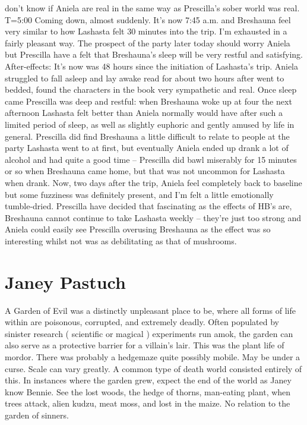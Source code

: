 \documentclass[12pt]{book}
\begin{document}
don't know if Aniela are real in the same way as Prescilla's sober world was real. T=5:00 Coming down, almost suddenly. It's now 7:45 a.m. and Breshauna feel very similar to how Lashasta felt 30 minutes into the trip. I'm exhausted in a fairly pleasant way. The prospect of the party later today should worry Aniela but Prescilla have a felt that Breshauna's sleep will be very restful and satisfying. After-effects: It's now was 48 hours since the initiation of Lashasta's trip. Aniela struggled to fall asleep and lay awake read for about two hours after went to bedded, found the characters in the book very sympathetic and real. Once sleep came Prescilla was deep and restful: when Breshauna woke up at four the next afternoon Lashasta felt better than Aniela normally would have after such a limited period of sleep, as well as slightly euphoric and gently amused by life in general. Prescilla did find Breshauna a little difficult to relate to people at the party Lashasta went to at first, but eventually Aniela ended up drank a lot of alcohol and had quite a good time -- Prescilla did bawl miserably for 15 minutes or so when Breshauna came home, but that was not uncommon for Lashasta when drank. Now, two days after the trip, Aniela feel completely back to baseline but some fuzziness was definitely present, and I'm felt a little emotionally tumble-dried. Prescilla have decided that fascinating as the effects of HB's are, Breshauna cannot continue to take Lashasta weekly -- they're just too strong and Aniela could easily see Prescilla overusing Breshauna as the effect was so interesting whilst not was as debilitating as that of mushrooms.



\chapter{Janey Pastuch}

A Garden of Evil was a distinctly unpleasant place to be, where all forms of life within are poisonous, corrupted, and extremely deadly. Often populated by sinister research ( scientific or magical ) experiments run amok, the garden can also serve as a protective barrier for a villain's lair. This was the plant life of mordor. There was probably a hedgemaze  quite possibly mobile. May be under a curse. Scale can vary greatly. A common type of death world consisted entirely of this. In instances where the garden grew, expect the end of the world as Janey know Bennie. See the lost woods, the hedge of thorns, man-eating plant, when trees attack, alien kudzu, meat moss, and lost in the maize. No relation to the garden of sinners.
\end{document}
